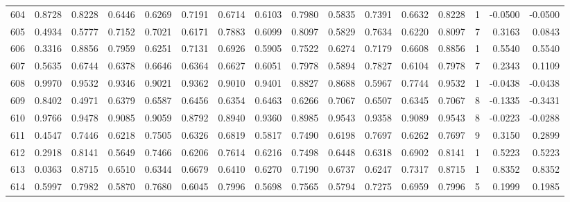 \begin{tabular}{lrrrrrrrrrrrrrrr}
604 &      0.8728 &  0.8228 &  0.6446 &  0.6269 &  0.7191 &  0.6714 &  0.6103 &  0.7980 &  0.5835 &  0.7391 &   0.6632 &     0.8228 &      1 &                   -0.0500 &                    -0.0500 \\
605 &      0.4934 &  0.5777 &  0.7152 &  0.7021 &  0.6171 &  0.7883 &  0.6099 &  0.8097 &  0.5829 &  0.7634 &   0.6220 &     0.8097 &      7 &                    0.3163 &                     0.0843 \\
606 &      0.3316 &  0.8856 &  0.7959 &  0.6251 &  0.7131 &  0.6926 &  0.5905 &  0.7522 &  0.6274 &  0.7179 &   0.6608 &     0.8856 &      1 &                    0.5540 &                     0.5540 \\
607 &      0.5635 &  0.6744 &  0.6378 &  0.6646 &  0.6364 &  0.6627 &  0.6051 &  0.7978 &  0.5894 &  0.7827 &   0.6104 &     0.7978 &      7 &                    0.2343 &                     0.1109 \\
608 &      0.9970 &  0.9532 &  0.9346 &  0.9021 &  0.9362 &  0.9010 &  0.9401 &  0.8827 &  0.8688 &  0.5967 &   0.7744 &     0.9532 &      1 &                   -0.0438 &                    -0.0438 \\
609 &      0.8402 &  0.4971 &  0.6379 &  0.6587 &  0.6456 &  0.6354 &  0.6463 &  0.6266 &  0.7067 &  0.6507 &   0.6345 &     0.7067 &      8 &                   -0.1335 &                    -0.3431 \\
610 &      0.9766 &  0.9478 &  0.9085 &  0.9059 &  0.8792 &  0.8940 &  0.9360 &  0.8985 &  0.9543 &  0.9358 &   0.9089 &     0.9543 &      8 &                   -0.0223 &                    -0.0288 \\
611 &      0.4547 &  0.7446 &  0.6218 &  0.7505 &  0.6326 &  0.6819 &  0.5817 &  0.7490 &  0.6198 &  0.7697 &   0.6262 &     0.7697 &      9 &                    0.3150 &                     0.2899 \\
612 &      0.2918 &  0.8141 &  0.5649 &  0.7466 &  0.6206 &  0.7614 &  0.6216 &  0.7498 &  0.6448 &  0.6318 &   0.6902 &     0.8141 &      1 &                    0.5223 &                     0.5223 \\
613 &      0.0363 &  0.8715 &  0.6510 &  0.6344 &  0.6679 &  0.6410 &  0.6270 &  0.7190 &  0.6737 &  0.6247 &   0.7317 &     0.8715 &      1 &                    0.8352 &                     0.8352 \\
614 &      0.5997 &  0.7982 &  0.5870 &  0.7680 &  0.6045 &  0.7996 &  0.5698 &  0.7565 &  0.5794 &  0.7275 &   0.6959 &     0.7996 &      5 &                    0.1999 &                     0.1985 \\

\end{tabular}
